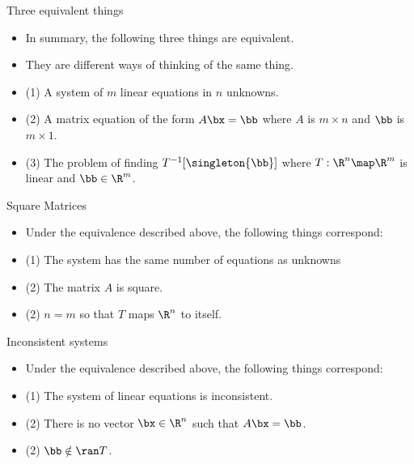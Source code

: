 \documentclass{beamer}
\begin{document}
\begin{frame}{Three equivalent things}

\begin{itemize}
\item In summary, the following three things are equivalent.
\item They are different ways of thinking of the same thing.
\item (1) A system of $m$ linear equations in $n$ unknowns.
\item (2) A matrix equation of the form $A\bx=\bb$ where $A$ is
$m\times n$ and $\bb$ is $m\times 1$.
\item (3) The problem of finding $T^{-1}[\singleton{\bb}]$ where
$T:\R^n\map\R^m$ is linear and $\bb\in\R^m$.
\end{itemize}

\end{frame}


\begin{frame}{Square Matrices}

\begin{itemize}
\item Under the equivalence described above, the following things correspond:
\item (1) The system has the same number of equations as unknowns
\item (2) The matrix $A$ is square.
\item (2) $n=m$ so that $T$ maps $\R^n$ to itself.
\end{itemize}

\end{frame}


\begin{frame}{Inconsistent systems}

\begin{itemize}
\item Under the equivalence described above, the following things correspond:
\item (1) The system of linear equations is inconsistent.
\item (2) There is no vector $\bx \in \R^n$ such that $A \bx = \bb$.
\item (2) $\bb \notin \ran T$.
\end{itemize}

\end{frame}
\end{document}
